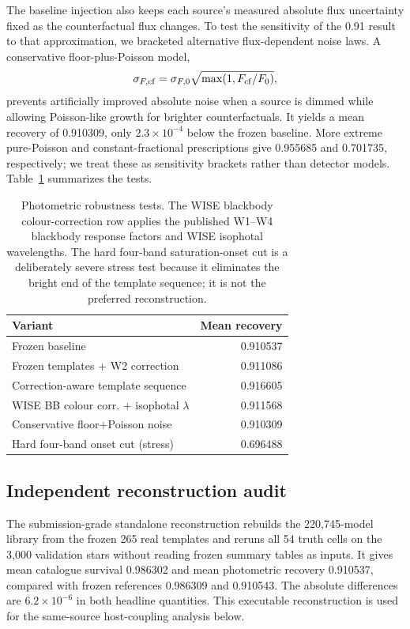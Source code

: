 \documentclass[fleqn,usenatbib]{mnras}
\begin{document}
The baseline injection also keeps each source's measured absolute flux uncertainty fixed as the counterfactual flux changes. To test the sensitivity of the 0.91 result to that approximation, we bracketed alternative flux-dependent noise laws. A conservative floor-plus-Poisson model,
\begin{equation}
\sigma_{F,\rm cf}=\sigma_{F,0}\sqrt{\max(1,F_{\rm cf}/F_0)},
\end{equation}
prevents artificially improved absolute noise when a source is dimmed while allowing Poisson-like growth for brighter counterfactuals. It yields a mean recovery of 0.910309, only $2.3\times10^{-4}$ below the frozen baseline. More extreme pure-Poisson and constant-fractional prescriptions give 0.955685 and 0.701735, respectively; we treat these as sensitivity brackets rather than detector models. Table~\ref{tab:photrobust} summarizes the tests.

\begin{table}
\centering
\caption{Photometric robustness tests. The WISE blackbody colour-correction row applies the published W1--W4 blackbody response factors and WISE isophotal wavelengths. The hard four-band saturation-onset cut is a deliberately severe stress test because it eliminates the bright end of the template sequence; it is not the preferred reconstruction.}
\label{tab:photrobust}
\begin{tabular}{lr}
\toprule
Variant & Mean recovery\\
\midrule
Frozen baseline & 0.910537\\
Frozen templates + W2 correction & 0.911086\\
Correction-aware template sequence & 0.916605\\
WISE BB colour corr. + isophotal $\lambda$ & 0.911568\\
Conservative floor+Poisson noise & 0.910309\\
Hard four-band onset cut (stress) & 0.696488\\
\bottomrule
\end{tabular}
\end{table}

\subsection{Independent reconstruction audit}

The submission-grade standalone reconstruction rebuilds the 220,745-model library from the frozen 265 real templates and reruns all 54 truth cells on the 3,000 validation stars without reading frozen summary tables as inputs. It gives mean catalogue survival 0.986302 and mean photometric recovery 0.910537, compared with frozen references 0.986309 and 0.910543. The absolute differences are $6.2\times10^{-6}$ in both headline quantities. This executable reconstruction is used for the same-source host-coupling analysis below.
\end{document}
